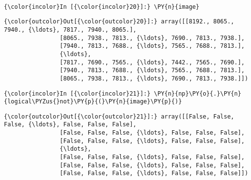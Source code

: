     \begin{center}
    \end{center}
    { \hspace*{\fill} \\}
    
    \begin{Verbatim}[commandchars=\\\{\},frame=single,framerule=0.3mm,rulecolor=\color{cellframecolor}]
{\color{incolor}In [{\color{incolor}20}]:} \PY{n}{image}
\end{Verbatim}


\begin{Verbatim}[commandchars=\\\{\},frame=single,framerule=0.3mm,rulecolor=\color{cellframecolor}]
{\color{outcolor}Out[{\color{outcolor}20}]:} array([[8192., 8065., 7940., {\ldots}, 7817., 7940., 8065.],
                [8065., 7938., 7813., {\ldots}, 7690., 7813., 7938.],
                [7940., 7813., 7688., {\ldots}, 7565., 7688., 7813.],
                {\ldots},
                [7817., 7690., 7565., {\ldots}, 7442., 7565., 7690.],
                [7940., 7813., 7688., {\ldots}, 7565., 7688., 7813.],
                [8065., 7938., 7813., {\ldots}, 7690., 7813., 7938.]])
\end{Verbatim}
            
    \begin{Verbatim}[commandchars=\\\{\},frame=single,framerule=0.3mm,rulecolor=\color{cellframecolor}]
{\color{incolor}In [{\color{incolor}21}]:} \PY{n}{np}\PY{o}{.}\PY{n}{logical\PYZus{}not}\PY{p}{(}\PY{n}{image}\PY{p}{)}
\end{Verbatim}


\begin{Verbatim}[commandchars=\\\{\},frame=single,framerule=0.3mm,rulecolor=\color{cellframecolor}]
{\color{outcolor}Out[{\color{outcolor}21}]:} array([[False, False, False, {\ldots}, False, False, False],
                [False, False, False, {\ldots}, False, False, False],
                [False, False, False, {\ldots}, False, False, False],
                {\ldots},
                [False, False, False, {\ldots}, False, False, False],
                [False, False, False, {\ldots}, False, False, False],
                [False, False, False, {\ldots}, False, False, False]])
\end{Verbatim}
            
